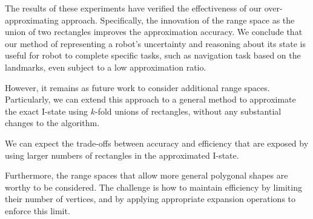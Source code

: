 The results of these experiments have verified the effectiveness of our over-approximating approach.
%
Specifically, the innovation of the range space as the union of
two rectangles improves the approximation accuracy. 
%
We conclude that our method of representing a robot's uncertainty and reasoning about its state is useful 
for robot to complete specific tasks, such as navigation task based on the landmarks, even subject to a low approximation ratio.

However, it remains as future work to consider additional range spaces.  
%
Particularly, we can extend this approach to a general method to approximate the exact I-state using $k$-fold unions of rectangles, 
without any substantial changes to the algorithm.  

We can expect the trade-offs between accuracy and efficiency that are exposed by using
larger numbers of rectangles in the approximated I-state.  

Furthermore, the range spaces that allow more general polygonal shapes are worthy to be considered. 
The challenge is how to maintain efficiency by limiting their number of vertices, 
and by applying appropriate expansion operations to enforce this limit.



